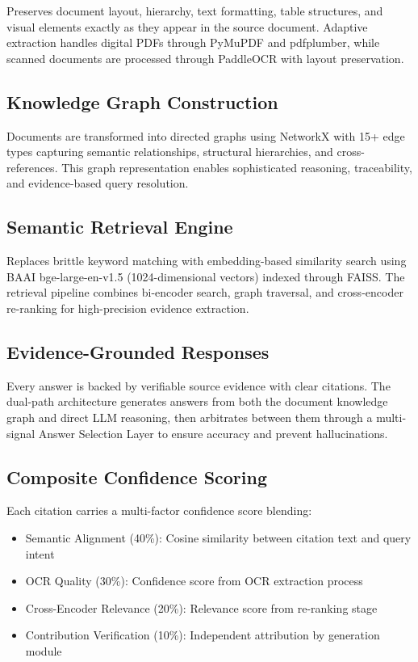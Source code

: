 \documentclass[11pt,a4paper]{article}
\begin{document}
Preserves document layout, hierarchy, text formatting, table structures, and visual elements exactly as they appear in the source document. Adaptive extraction handles digital PDFs through PyMuPDF and pdfplumber, while scanned documents are processed through PaddleOCR with layout preservation.

\subsection{Knowledge Graph Construction}

Documents are transformed into directed graphs using NetworkX with 15+ edge types capturing semantic relationships, structural hierarchies, and cross-references. This graph representation enables sophisticated reasoning, traceability, and evidence-based query resolution.

\subsection{Semantic Retrieval Engine}

Replaces brittle keyword matching with embedding-based similarity search using BAAI bge-large-en-v1.5 (1024-dimensional vectors) indexed through FAISS. The retrieval pipeline combines bi-encoder search, graph traversal, and cross-encoder re-ranking for high-precision evidence extraction.

\subsection{Evidence-Grounded Responses}

Every answer is backed by verifiable source evidence with clear citations. The dual-path architecture generates answers from both the document knowledge graph and direct LLM reasoning, then arbitrates between them through a multi-signal Answer Selection Layer to ensure accuracy and prevent hallucinations.

\subsection{Composite Confidence Scoring}

Each citation carries a multi-factor confidence score blending:
\begin{itemize}[leftmargin=*]
    \item Semantic Alignment (40\%): Cosine similarity between citation text and query intent
    \item OCR Quality (30\%): Confidence score from OCR extraction process
    \item Cross-Encoder Relevance (20\%): Relevance score from re-ranking stage
    \item Contribution Verification (10\%): Independent attribution by generation module
\end{itemize}
\end{document}
